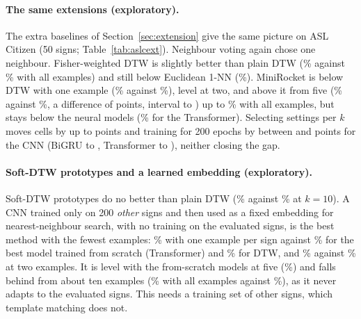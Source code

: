 \paragraph{The same extensions (exploratory).} The extra baselines of Section~\ref{sec:extension} give the same picture on ASL Citizen (50 signs; Table~\ref{tab:aslcext}).
Neighbour voting again chose one neighbour. Fisher-weighted DTW is slightly better than plain DTW (\czaccWdtwVFiftyKAll\% against \czaccDtwVFiftyKAll\% with all examples) and still below Euclidean
1-NN (\czaccEuclidVFiftyKAll\%). MiniRocket is below DTW with one example (\czaccRocketVFiftyKOne\% against \czaccDtwVFiftyKOne\%), level at two, and above it from five
(\czaccRocketVFiftyKFive\% against \czaccDtwVFiftyKFive\%, a difference of \czdifRocketVFiftyKFive{} points, interval \czdifLoRocketVFiftyKFive{} to \czdifHiRocketVFiftyKFive{}) up to
\czaccRocketVFiftyKAll\% with all examples, but stays below the neural models (\czaccTransVFiftyKAll\% for the Transformer). Selecting settings per $k$ moves cells by up to \czperkMaxChange{} points and
training for 200 epochs by between \czlongMinGainCnn{} and \czlongMaxGainCnn{} points for the CNN (BiGRU \czlongMinGainGru{} to \czlongMaxGainGru{}, Transformer \czlongMinGainTrans{} to \czlongMaxGainTrans{}),
neither closing the gap.
\paragraph{Soft-DTW prototypes and a learned embedding (exploratory).} Soft-DTW prototypes do no better than plain DTW (\czaccSoftProtoVFiftyKTen\% against \czaccDtwVFiftyKTen\% at $k=10$). A CNN trained
only on 200 \emph{other} signs and then used as a fixed embedding for nearest-neighbour search, with no training on the evaluated signs, is the best method with the fewest examples:
\czaccEmbedVFiftyKOne\% with one example per sign against \czaccTransVFiftyKOne\% for the best model trained from scratch (Transformer) and \czaccDtwVFiftyKOne\% for DTW,
and \czaccEmbedVFiftyKTwo\% against \czaccTransVFiftyKTwo\% at two examples. It is level with the from-scratch models at five (\czaccEmbedVFiftyKFive\%) and falls behind from about ten examples
(\czaccEmbedVFiftyKAll\% with all examples against \czaccTransVFiftyKAll\%), as it never adapts to the evaluated signs. This needs a training set of other signs, which template matching does not.
\begin{table}[t]
\centering\small
\resizebox{\columnwidth}{!}{}
\caption{ASL Citizen, 50 signs: top-1 accuracy (\%) of additional methods and variants (exploratory) beside the main ones.}
\label{tab:aslcext}
\end{table}
